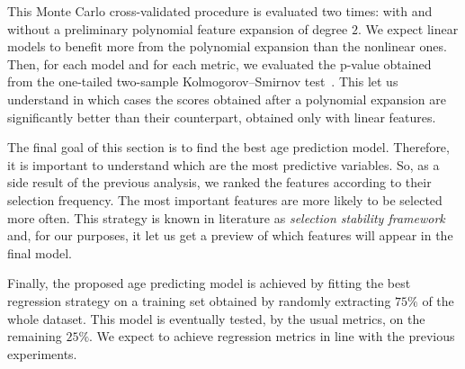 This Monte Carlo cross-validated procedure is evaluated two times: with and without a preliminary polynomial feature expansion of degree $2$. We expect linear models to benefit more from the polynomial expansion than the nonlinear ones.
Then, for each model and for each metric, we evaluated the p-value obtained from the one-tailed two-sample Kolmogorov–Smirnov test~\cite{everitt2002cambridge}. This let us understand in which cases the scores obtained after a polynomial expansion are significantly better than their counterpart, obtained only with  linear features.

The final goal of this section is to find the best age prediction model. Therefore, it is important to understand which are the most predictive variables.
So, as a side result of the previous analysis, we ranked the features according to their selection frequency. The most important features are more likely to be selected more often. This strategy is known in literature as  \textit{selection stability framework}~\cite{meinshausen2010stability, barbieri16palladio} and, for our purposes, it let us get a preview of which features will appear in the final model.

Finally, the proposed age predicting model is achieved by fitting the best regression strategy on a training set obtained by randomly extracting $75\%$ of the whole dataset. This model is eventually tested, by the usual metrics, on the remaining $25\%$. We expect to achieve regression metrics in line with the previous experiments.

